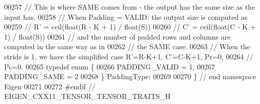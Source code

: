 \begin{DoxyCode}
00257 \textcolor{comment}{// This is where SAME comes from - the output has the same size as the input has.}
00258 \textcolor{comment}{// When Padding = VALID: the output size is computed as}
00259 \textcolor{comment}{//   R' = ceil(float(R - K + 1) / float(S))}
00260 \textcolor{comment}{//   C' = ceil(float(C - K + 1) / float(S))}
00261 \textcolor{comment}{// and the number of padded rows and columns are computed in the same way as in}
00262 \textcolor{comment}{// the SAME case.}
00263 \textcolor{comment}{// When the stride is 1, we have the simplified case R'=R-K+1, C'=C-K+1, Pr=0,}
00264 \textcolor{comment}{// Pc=0.}
00265 \textcolor{keyword}{typedef} \textcolor{keyword}{enum} \{
00266   PADDING\_VALID = 1,
00267   PADDING\_SAME = 2
00268 \} PaddingType;
00269 
00270 \}  \textcolor{comment}{// end namespace Eigen}
00271 
00272 \textcolor{preprocessor}{#endif // EIGEN\_CXX11\_TENSOR\_TENSOR\_TRAITS\_H}
\end{DoxyCode}
